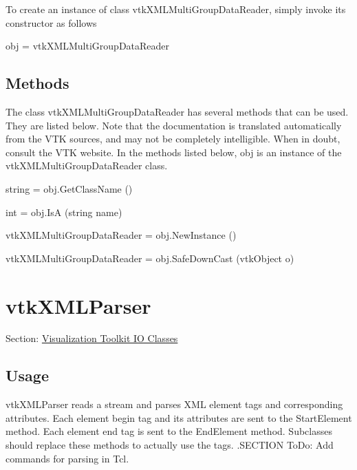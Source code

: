 To create an instance of class vtk\-X\-M\-L\-Multi\-Group\-Data\-Reader, simply invoke its constructor as follows \begin{DoxyVerb}  obj = vtkXMLMultiGroupDataReader
\end{DoxyVerb}
 \hypertarget{vtkwidgets_vtkxyplotwidget_Methods}{}\subsection{Methods}\label{vtkwidgets_vtkxyplotwidget_Methods}
The class vtk\-X\-M\-L\-Multi\-Group\-Data\-Reader has several methods that can be used. They are listed below. Note that the documentation is translated automatically from the V\-T\-K sources, and may not be completely intelligible. When in doubt, consult the V\-T\-K website. In the methods listed below, {\ttfamily obj} is an instance of the vtk\-X\-M\-L\-Multi\-Group\-Data\-Reader class. 
\begin{DoxyItemize}
\item {\ttfamily string = obj.\-Get\-Class\-Name ()}  
\item {\ttfamily int = obj.\-Is\-A (string name)}  
\item {\ttfamily vtk\-X\-M\-L\-Multi\-Group\-Data\-Reader = obj.\-New\-Instance ()}  
\item {\ttfamily vtk\-X\-M\-L\-Multi\-Group\-Data\-Reader = obj.\-Safe\-Down\-Cast (vtk\-Object o)}  
\end{DoxyItemize}\hypertarget{vtkio_vtkxmlparser}{}\section{vtk\-X\-M\-L\-Parser}\label{vtkio_vtkxmlparser}
Section\-: \hyperlink{sec_vtkio}{Visualization Toolkit I\-O Classes} \hypertarget{vtkwidgets_vtkxyplotwidget_Usage}{}\subsection{Usage}\label{vtkwidgets_vtkxyplotwidget_Usage}
vtk\-X\-M\-L\-Parser reads a stream and parses X\-M\-L element tags and corresponding attributes. Each element begin tag and its attributes are sent to the Start\-Element method. Each element end tag is sent to the End\-Element method. Subclasses should replace these methods to actually use the tags. .S\-E\-C\-T\-I\-O\-N To\-Do\-: Add commands for parsing in Tcl.

